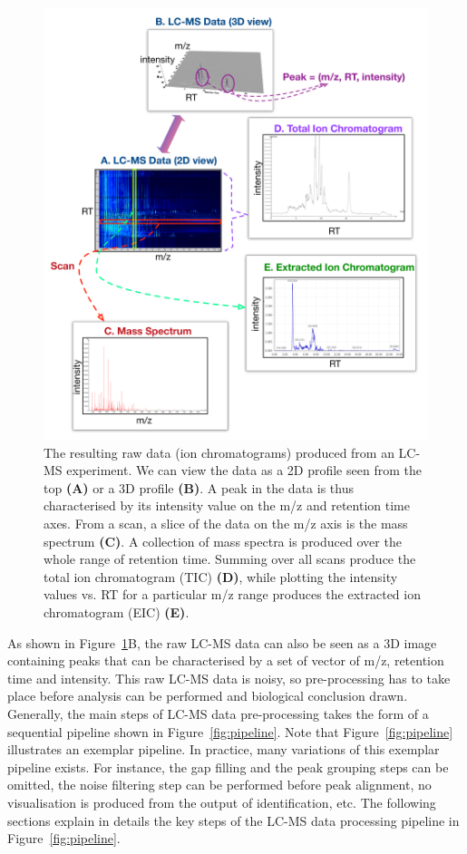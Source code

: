 \begin{figure}
\noindent \begin{centering}
\includegraphics[width=1.0\textwidth]{02-background/figures/spectra.pdf}
\par\end{centering}
\caption{\label{fig:LC-MS-data}The resulting raw data (ion chromatograms) produced from an LC-MS experiment. We can view the data as a 2D profile seen from the top \textbf{(A)} or a 3D profile \textbf{(B)}. A peak in the data is thus characterised by its intensity value on the m/z and retention time axes. From a scan, a slice of the data on the m/z axis is the mass spectrum \textbf{(C)}. A collection of mass spectra is produced over the whole range of retention time. Summing over all scans produce the total ion chromatogram (TIC) \textbf{(D)}, while plotting the intensity values vs. RT for a particular m/z range produces the extracted ion chromatogram (EIC) \textbf{(E)}.}
\end{figure}

As shown in Figure~\ref{fig:LC-MS-data}B, the raw LC-MS data can also be seen as a 3D image containing peaks that can be characterised by a set of vector of m/z, retention time and intensity. This raw LC-MS data is noisy, so pre-processing has to take place before analysis can be performed and biological conclusion drawn. Generally, the main steps of LC-MS data pre-processing takes the form of a sequential pipeline shown in Figure~\ref{fig:pipeline}. Note that Figure~\ref{fig:pipeline} illustrates an exemplar pipeline. In practice, many variations of this exemplar pipeline exists. For instance, the gap filling and the peak grouping steps can be omitted, the noise filtering step can be performed before peak alignment, no visualisation is produced from the output of identification, etc. The following sections explain in details the key steps of the LC-MS data processing pipeline in Figure~\ref{fig:pipeline}.

